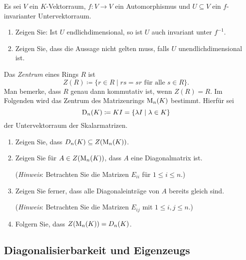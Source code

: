 \begin{question}[subtitle = Einschränkung des Inversen]{3}
  Es sei $V$ ein $K$-Vektorraum, $f \colon V \to V$ ein Automorphismus und $U \subseteq V$ ein $f$-invarianter Untervektorraum.
  \begin{enumerate}[leftmargin=*]
    \item
      Zeigen Sie:
      Ist $U$ endlichdimensional, so ist $U$ auch invariant unter $f^{-1}$.
    \item
      Zeigen Sie, dass die Aussage nicht gelten muss, falls $U$ unendlichdimensional ist.
  \end{enumerate}
\end{question}







\begin{question}[subtitle = Das Zentrum des Matrizenrings]{4}
  Das \emph{Zentrum} eines Rings $R$ ist
  \[
    Z(R) \coloneqq \{ r \in R \mid \text{$rs = sr$ für alle $s \in R$} \}.
  \]
  Man bemerke, dass $R$ genau dann kommutativ ist, wenn $Z(R) = R$.
  Im Folgenden wird das Zentrum des Matrizenrings $\operatorname{M}_n(K)$ bestimmt.
  Hierfür sei
  \[
              \operatorname{D}_n(K)
    \coloneqq K I
    =         \{\lambda I \mid \lambda \in K\}
  \]
  der Untervektorraum der Skalarmatrizen.
  \begin{enumerate}[leftmargin=*]
    \item
      Zeigen Sie, dass $D_n(K) \subseteq Z(\operatorname{M}_n(K))$.
    \item
      Zeigen Sie für $A \in Z(\operatorname{M}_n(K))$, dass $A$ eine Diagonalmatrix ist.
      
      (\emph{Hinweis}:
       Betrachten Sie die Matrizen $E_{ii}$ für $1 \leq i \leq n$.)
    \item
      Zeigen Sie ferner, dass alle Diagonaleinträge von $A$ bereits gleich sind.
      
      (\emph{Hinweis}:
       Betrachten Sie die Matrizen $E_{ij}$ mit $1 \leq i,j \leq n$.)
    \item
      Folgern Sie, dass $Z(\operatorname{M}_n(K)) = D_n(K)$.
  \end{enumerate}
\end{question}










\subsection{Diagonalisierbarkeit und Eigenzeugs}


